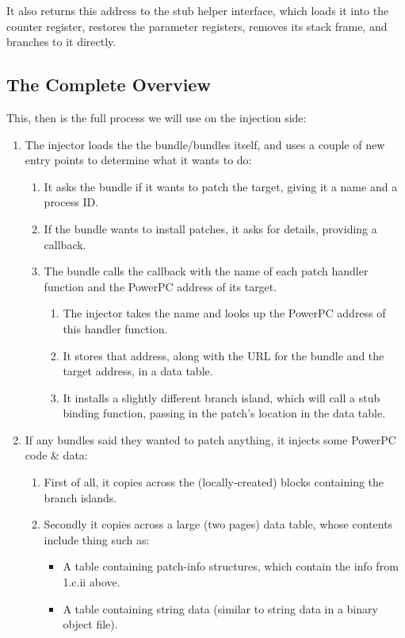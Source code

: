 \documentclass[english]{article}
\begin{document}
It also returns this address to the stub helper interface, which loads it into the counter register, restores the parameter registers, removes its stack frame, and branches to it directly.


\subsection{The Complete Overview}
This, then is the full process we will use on the injection side:

\begin{enumerate}
  \item The injector loads the the bundle/bundles itself, and uses a couple of new entry points to determine what it wants to do:
  \begin{enumerate}
    \item It asks the bundle if it wants to patch the target, giving it a name and a process ID.
    \item If the bundle wants to install patches, it asks for details, providing a callback.
    \item The bundle calls the callback with the name of each patch handler function and the PowerPC address of its target.
    \begin{enumerate}
      \item The injector takes the name and looks up the PowerPC address of this handler function.
      \item It stores that address, along with the URL for the bundle and the target address, in a data table.
      \item It installs a slightly different branch island, which will call a stub binding function, passing in the patch's location in the data table.
    \end{enumerate}
  \end{enumerate}
  \item If any bundles said they wanted to patch anything, it injects some PowerPC code \& data:
  \begin{enumerate}
    \item First of all, it copies across the (locally-created) blocks containing the branch islands.
    \item Secondly it copies across a large (two pages) data table, whose contents include thing such as:
    \begin{itemize}
      \item A table containing patch-info structures, which contain the info from 1.c.ii above.
      \item A table containing string data (similar to string data in a binary object file).

\end{itemize}
\end{enumerate}
\end{enumerate}
\end{document}
